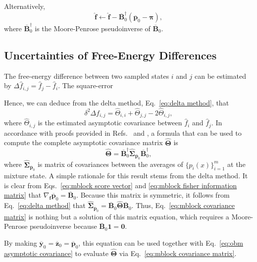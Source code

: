 \documentclass[journal=jctcce,manuscript=article,layout=twocolumn]{achemso}
\newcommand{\mt}[1]{\boldsymbol{\mathbf{#1}}}   %
\newcommand{\vt}[1]{\boldsymbol{\mathbf{#1}}}   %
\newcommand{\avg}[1]{\overline{#1}}             %
\begin{document}
Alternatively,
\begin{equation*}
\label{eq:mics Newton-Raphson}
\hat{\vt f} \leftarrow \hat{\vt f} - \avg{\mt B}_0^\dag(\avg{\vt p}_0 - {\vt \pi}),
\end{equation*}
where $\avg{\mt B}_0^\dag$ is the Moore-Penrose pseudoinverse of $\avg{\mt B}_0$.

\subsection{Uncertainties of Free-Energy Differences}
\label{sec:uncertainties of free-energy differences}

The free-energy difference between two sampled states $i$ and $j$ can be estimated by $\Delta \hat f_{i,j} = \hat f_j - \hat f_i$. The square-error 

Hence, we can deduce from the delta method, Eq.~\eqref{eq:delta method}, that
\begin{equation}
\delta^2 \Delta f_{i,j} = \hat \Theta_{i,i} + \hat \Theta_{j,j} - 2\hat \Theta_{i,j},
\end{equation}
where $\hat \Theta_{i,j}$ is the estimated asymptotic covariance between $\hat f_i$ and $\hat f_j$. In accordance with proofs provided in Refs.~ and , a formula that can be used to compute the complete asymptotic covariance matrix $\hat{\mt \Theta}$ is
\begin{equation}
\label{eq:mblock covariance matrix}
\hat{\mt \Theta} = \avg{\mt B}_0^\dag \hat{\mt \Sigma}_{\avg{\vt p}_0} \avg{\mt B}_0^\dag,
\end{equation}
where $\hat{\mt \Sigma}_{\avg{\vt p}_0}$ is matrix of covariances between the averages of $\{p_i(x)\}_{i=1}^m$ at the mixture state. A simple rationale for this result stems from the delta method. It is clear from Eqs.~\eqref{eq:mblock score vector} and \eqref{eq:mblock fisher information matrix} that $\nabla_{\vt f}\avg{\vt p}_0 = \avg{\mt B}_0$. Because this matrix is symmetric, it follows from Eq.~\eqref{eq:delta method} that $\hat{\mt \Sigma}_{\avg{\vt p}_0} = \avg{\mt B}_0 \hat{\mt \Theta} \avg{\mt B}_0$. Thus, Eq.~\eqref{eq:mblock covariance matrix} is nothing but a solution of this matrix equation, which requires a Moore-Penrose pseudoinverse because $\avg{\mt B}_0 \vt 1 = \vt 0$.

By making $\avg{\vt y}_0 = \avg{\vt z}_0 = \avg{\vt p}_0$, this equation can be used together with Eq.~\eqref{eq:obm asymptotic covariance} to evaluate $\hat{\mt \Theta}$ via Eq.~\eqref{eq:mblock covariance matrix}.
\end{document}
